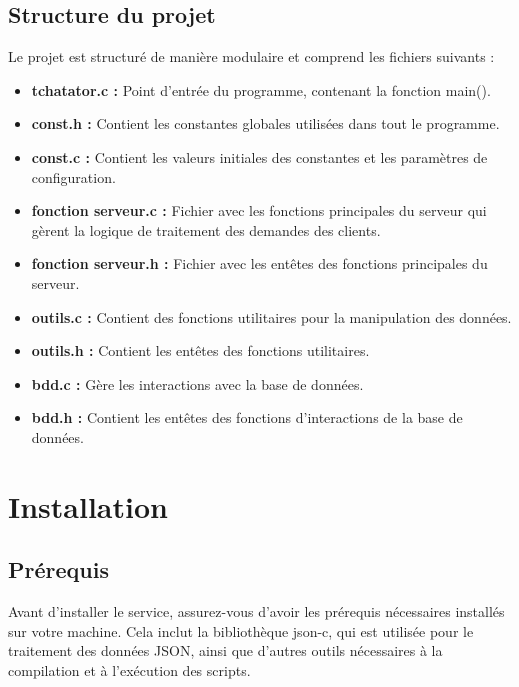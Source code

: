 \documentclass{report}
\begin{document}
\subsection{Structure du projet}

Le projet est structuré de manière modulaire et comprend les fichiers suivants :

\begin{itemize}
	\item \textbf{tchatator.c :} Point d'entrée du programme, contenant la fonction main().
	
	\item \textbf{const.h :} Contient les constantes globales utilisées dans tout le programme.
	
	\item \textbf{const.c :} Contient les valeurs initiales des constantes et les paramètres de configuration.
	
	\item \textbf{fonction serveur.c :} Fichier avec les fonctions principales du serveur qui gèrent la logique de traitement des demandes des clients.
	
	\item \textbf{fonction serveur.h :} Fichier avec les entêtes des fonctions principales du serveur.
	
	\item \textbf{outils.c :} Contient des fonctions utilitaires pour la manipulation des données.
	
	\item \textbf{outils.h :} Contient les entêtes des fonctions utilitaires.
	
	\item \textbf{bdd.c :} Gère les interactions avec la base de données.
	
	\item \textbf{bdd.h :} Contient les entêtes des fonctions d'interactions de la base de données.
	
\end{itemize}

\section{Installation}

\subsection{Prérequis}

Avant d'installer le service, assurez-vous d'avoir les prérequis nécessaires installés sur votre machine. Cela inclut la bibliothèque json-c, qui est utilisée pour le traitement des données JSON, ainsi que d'autres outils nécessaires à la compilation et à l'exécution des scripts.
\end{document}
